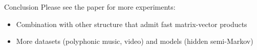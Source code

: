 \documentclass{beamer}
\newlength{\onecolwid}
\begin{document}
\begin{frame}
\begin{columns}[t]
\begin{column}{\onecolwid}
\begin{block}{Conclusion}
Please see the paper for more experiments:
\begin{itemize}
\item Combination with other structure that admit fast matrix-vector products
\item More datasets (polyphonic music, video) and models (hidden semi-Markov)
\end{itemize}

\end{block}






\end{column} %

\end{columns} %

\end{frame}
\end{document}
